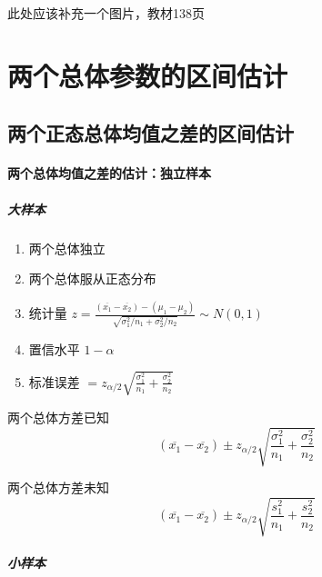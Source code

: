 \documentclass[UTF8,10pt]{book}
\begin{document}
                此处应该补充一个图片，教材138页

        \section{两个总体参数的区间估计}

            \subsection{两个正态总体均值之差的区间估计}

                \paragraph{两个总体均值之差的估计：独立样本}

                    \subparagraph{大样本}   %
                        {\kaishu            %

                        \begin{enumerate}
                            \item 两个总体独立
                            \item 两个总体服从正态分布
                            \item 统计量 $  z = \frac{\left( \overline{x_1}-\overline{x_2} \right) - \left(\mu_1 - \mu_2\right)}{\sqrt{ \sigma_1^2 / n_1  +  \sigma_2^2 / n_2  }}  \sim N(0,1) $
                            \item 置信水平 $1-\alpha$                            
                            \item 标准误差 $  = z_{\alpha/2} \sqrt{  \frac{\sigma_1^2}{n_1} + \frac{\sigma_2^2}{n_2}   }  $
                        \end{enumerate}                                  
                        }
                        {\kaishu 两个总体方差已知}
                            $$\left( \overline{x_1}-\overline{x_2} \right)  \pm z_{\alpha/2} \sqrt{  \frac{\sigma_1^2}{n_1} + \frac{\sigma_2^2}{n_2}   }$$

                        {\kaishu 两个总体方差未知}
                            $$\left( \overline{x_1}-\overline{x_2} \right)  \pm z_{\alpha/2} \sqrt{  \frac{s_1^2}{n_1} + \frac{s_2^2}{n_2}   }$$




                    \subparagraph{小样本}
\end{document}
